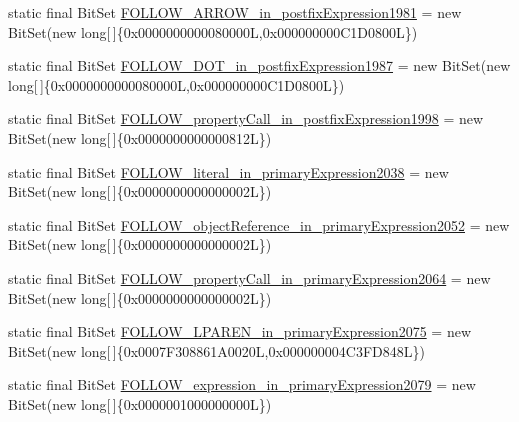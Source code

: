 \begin{DoxyCompactItemize}
\item 
static final Bit\-Set \hyperlink{classorg_1_1tzi_1_1use_1_1parser_1_1shell_1_1_shell_command_parser_ad7a1d2c0677907baa6b0215e1b08c11f}{F\-O\-L\-L\-O\-W\-\_\-\-A\-R\-R\-O\-W\-\_\-in\-\_\-postfix\-Expression1981} = new Bit\-Set(new long\mbox{[}$\,$\mbox{]}\{0x0000000000080000\-L,0x000000000\-C1\-D0800\-L\})
\item 
static final Bit\-Set \hyperlink{classorg_1_1tzi_1_1use_1_1parser_1_1shell_1_1_shell_command_parser_afcb2f3edec375cdd26834306f7b5ea1d}{F\-O\-L\-L\-O\-W\-\_\-\-D\-O\-T\-\_\-in\-\_\-postfix\-Expression1987} = new Bit\-Set(new long\mbox{[}$\,$\mbox{]}\{0x0000000000080000\-L,0x000000000\-C1\-D0800\-L\})
\item 
static final Bit\-Set \hyperlink{classorg_1_1tzi_1_1use_1_1parser_1_1shell_1_1_shell_command_parser_a16f8b45ce82cf09834af865169f17ae8}{F\-O\-L\-L\-O\-W\-\_\-property\-Call\-\_\-in\-\_\-postfix\-Expression1998} = new Bit\-Set(new long\mbox{[}$\,$\mbox{]}\{0x0000000000000812\-L\})
\item 
static final Bit\-Set \hyperlink{classorg_1_1tzi_1_1use_1_1parser_1_1shell_1_1_shell_command_parser_aafdf690c7d044daf9a699247c154f8ff}{F\-O\-L\-L\-O\-W\-\_\-literal\-\_\-in\-\_\-primary\-Expression2038} = new Bit\-Set(new long\mbox{[}$\,$\mbox{]}\{0x0000000000000002\-L\})
\item 
static final Bit\-Set \hyperlink{classorg_1_1tzi_1_1use_1_1parser_1_1shell_1_1_shell_command_parser_a1dba9c22a547aa57377058d392131528}{F\-O\-L\-L\-O\-W\-\_\-object\-Reference\-\_\-in\-\_\-primary\-Expression2052} = new Bit\-Set(new long\mbox{[}$\,$\mbox{]}\{0x0000000000000002\-L\})
\item 
static final Bit\-Set \hyperlink{classorg_1_1tzi_1_1use_1_1parser_1_1shell_1_1_shell_command_parser_ad3c58dc9747a8c1075c8dbbe13b93a55}{F\-O\-L\-L\-O\-W\-\_\-property\-Call\-\_\-in\-\_\-primary\-Expression2064} = new Bit\-Set(new long\mbox{[}$\,$\mbox{]}\{0x0000000000000002\-L\})
\item 
static final Bit\-Set \hyperlink{classorg_1_1tzi_1_1use_1_1parser_1_1shell_1_1_shell_command_parser_a8c781d64f8a03b87f03a4cfed21ef950}{F\-O\-L\-L\-O\-W\-\_\-\-L\-P\-A\-R\-E\-N\-\_\-in\-\_\-primary\-Expression2075} = new Bit\-Set(new long\mbox{[}$\,$\mbox{]}\{0x0007\-F308861\-A0020\-L,0x000000004\-C3\-F\-D848\-L\})
\item 
static final Bit\-Set \hyperlink{classorg_1_1tzi_1_1use_1_1parser_1_1shell_1_1_shell_command_parser_ac1acce87f1e8cb2b609ec6529ce1cb5d}{F\-O\-L\-L\-O\-W\-\_\-expression\-\_\-in\-\_\-primary\-Expression2079} = new Bit\-Set(new long\mbox{[}$\,$\mbox{]}\{0x0000001000000000\-L\})

\end{DoxyCompactItemize}
